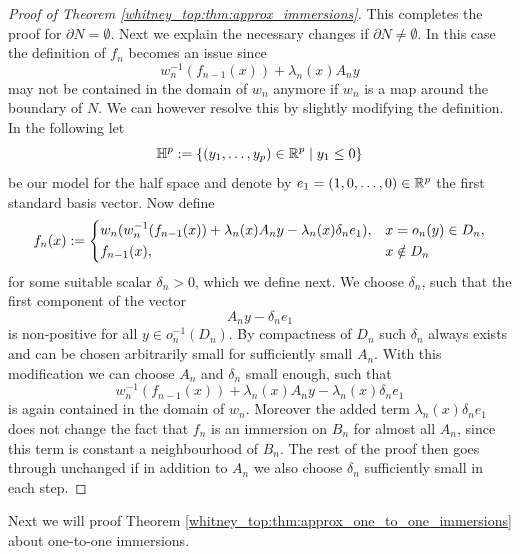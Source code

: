 \begin{proof}[Proof of Theorem \ref{whitney_top:thm:approx_immersions}]
    This completes the proof for $\partial N = \emptyset$. Next we explain the necessary changes if $\partial N \neq \emptyset$. In this case the definition of $f_n$ becomes an issue since 
    \[
    w_n^{-1}(f_{n-1}(x)) + \lambda_n(x)A_ny
    \]
    may not be contained in the domain of $w_n$ anymore if $w_n$ is a map around the boundary of $N$. We can however resolve this by slightly modifying the definition. In the following let 
    \[
    \mathbb{H}^p := \{(y_1,\ldots,y_p) \in \mathbb{R}^p \mid y_1 \leq 0\}
    \]
    be our model for the half space and denote by $e_1 = (1,0,\ldots,0) \in \mathbb{R}^p$ the first standard basis vector. Now define
    \[
    f_n(x) := \begin{dcases}
        w_n(w_n^{-1}(f_{n-1}(x)) + \lambda_n(x)A_ny - \lambda_n(x) \delta_n e_1), & x = o_n(y) \in D_n, \\
        f_{n-1}(x), & x \notin D_n
    \end{dcases}
    \]
    for some suitable scalar $\delta_n >0$, which we define next. We choose $\delta_n$, such that the first component of the vector 
    \[
    A_n y - \delta _n e_1
    \]
    is non-positive for all $y \in o_n^{-1}(D_n)$. By compactness of $D_n$ such $\delta_n$ always exists and can be chosen arbitrarily small for sufficiently small $A_n$. With this modification we can choose $A_n$ and $\delta_n$ small enough, such that 
    \[
    w_n^{-1}(f_{n-1}(x)) + \lambda_n(x)A_ny - \lambda_n(x) \delta_n e_1
    \]
    is again contained in the domain of $w_n$. Moreover the added term $\lambda_n(x) \delta_n e_1$ does not change the fact that $f_n$ is an immersion on $B_n$ for almost all $A_n$, since this term is constant a neighbourhood of $B_n$. The rest of the proof then goes through unchanged if in addition to $A_n$ we also choose $\delta_n$ sufficiently small in each step.
\end{proof}

Next we will proof Theorem \ref{whitney_top:thm:approx_one_to_one_immersions} about one-to-one immersions.

